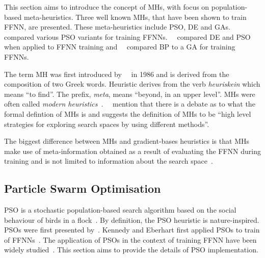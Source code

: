 This section aims to introduce the concept of \acp{MH}, with focus on population-based meta-heuristics. Three well known \acp{MH}, that have been shown to train \acs{FFNN}, are presented. These meta-heuristics include \acf{PSO}, \acf{DE} and \acfp{GA}.~\citeauthor{ref:carvalho:2006}~\cite{ref:carvalho:2006} compared various \acs{PSO} variants for training \acp{FFNN}.~\citeauthor{ref:espinal:2011}~\cite{ref:espinal:2011} compared \acs{DE} and \acs{PSO} when applied to \acs{FFNN} training and~\citeauthor{ref:gupta:1999}~\cite{ref:gupta:1999} compared \acs{BP} to a \acs{GA} for training \acp{FFNN}.

The term \acf{MH} was first introduced by~\citeauthor{ref:glover:1986}~\cite{ref:glover:1986} in 1986 and is derived from the composition of two Greek words. Heuristic derives from the verb \textit{heuriskein} which means ``to find''. The prefix, \textit{meta}, means ``beyond, in an upper level''. \Acp{MH} were often called \textit{modern heuristics}~\cite{ref:reeves:1993}.~\citeauthor{ref:blum:2003}~\cite{ref:blum:2003} mention that there is a debate as to what the formal defintion of \acp{MH} is and suggests the definition of \acp{MH} to be ``high level strategies for exploring search spaces by using different methods''.

The biggest difference between \acp{MH} and gradient-bases heuristics is that
\acp{MH} make use of meta-information obtained as a result of evaluating the \acs{FFNN} during training and is not limited to information about the search space~\cite{ref:blum:2003}.


\subsection{Particle Swarm Optimisation}\label{sec:heuristics:mh:pso}

\Acf{PSO} is a stochastic population-based search algorithm based on the social behaviour of birds in a flock~\cite{ref:kennedy:1995}. By definition, the \acs{PSO} heuristic is nature-inspired.  \Acp{PSO} were first presented  by~\citeauthor{ref:kennedy:1995}\cite{ref:kennedy:1995}. Kennedy and Eberhart first applied \acp{PSO} to train of \acp{FFNN}~\cite{ref:eberhart:1995, ref:kennedy:1997}. The application of \acp{PSO} in the context of training \acs{FFNN} have been widely studied~\cite{ref:rakitianskaia:2012, ref:vanwyk:2014}. This section aims to provide the details of \acs{PSO} implementation.

